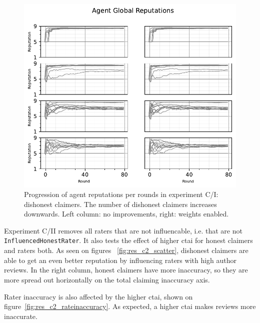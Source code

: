 \documentclass[%
    ]{\PathToTumTemplate/thesis/tum_thesis}
\begin{document}
\begin{figure}[tbp]
  \begin{center}
        \includegraphics[width=0.75\linewidth]	{../results/c/ReputationsPerRounds_joined.pdf}
    \caption{
 	Progression of agent reputations per rounds in experiment C/I: dishonest claimers.
    The number of dishonest claimers increases downwards.
    Left column: no improvements, right: weights enabled.
    }
    \label{fig:res_c_reps}
  \end{center}
\end{figure}

Experiment C/II removes all raters that are not influencable, i.e. that are not \texttt{InfluencedHonestRater}.
It also tests the effect of higher \gls{ctai} for honest claimers and raters both.
As seen on figures ~\ref{fig:res_c2_scatter}, dishonest claimers are able to get an even better reputation by influencing raters with high author reviews.
In the right column, honest claimers have more inaccuracy, so they are more spread out horizontally on the total claiming inaccuracy axis.

Rater inaccuracy is also affected by the higher \gls{ctai}, shown on figure~\ref{fig:res_c2_rateinaccuracy}.
As expected, a higher \gls{ctai} makes reviews more inaccurate.
\end{document}
